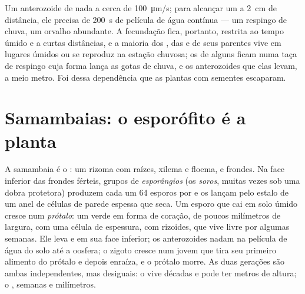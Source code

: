 \begin{example}\label{ex:b2:plant-life-cycles:sperm}
Um anterozoide de  nada a cerca de \qty{100}{\micro m/s}; para
alcançar um  a \qty{2}{cm} de distância, ele precisa de
\qty{200}{s} de película de água contínua --- um respingo de chuva, um
orvalho abundante. A fecundação fica, portanto, restrita ao tempo
úmido e a curtas distâncias, e a maioria dos , das  e
de seus parentes vive em lugares úmidos ou se reproduz na estação
chuvosa; os  de alguns  ficam numa taça de respingo
cuja forma lança as gotas de chuva, e os anterozoides que elas levam, a
meio metro. Foi dessa dependência que as plantas com sementes
escaparam.
\end{example}

\section{Samambaias: o esporófito é a planta}

\begin{definition}\label{def:b2:plant-life-cycles:fern}
A samambaia é o \emph{}: um rizoma com raízes, xilema e
floema, e frondes. Na face inferior das frondes férteis, grupos de
\emph{esporângios} (os \emph{soros}, muitas vezes sob uma dobra
protetora) produzem cada um 64 esporos por  e os lançam pelo
estalo de um anel de células de parede espessa que seca. Um esporo que
cai em solo úmido cresce num \emph{prótalo}: um  verde em
forma de coração, de poucos milímetros de largura, com uma célula de
espessura, com rizoides, que vive livre por algumas semanas. Ele leva
 e  em sua face inferior; os anterozoides nadam
na película de água do solo até a oosfera; o zigoto cresce num jovem
 que tira seu primeiro alimento do prótalo e depois enraíza,
e o prótalo morre. As duas gerações são ambas independentes, mas
desiguais: o  vive décadas e pode ter metros de altura; o
, semanas e milímetros.
\end{definition}

